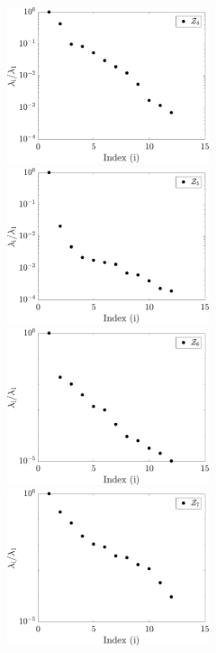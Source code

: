 \begin{figure}[htbp]
\begin{center}
\begin{subfigure}{0.35\textwidth}
\\
\includegraphics[width=0.65\textwidth]{./Figures/eig_Zf4} 
\\
\includegraphics[width=0.65\textwidth]{./Figures/eig_Zf5} 
\\
\includegraphics[width=0.65\textwidth]{./Figures/eig_Zf6} 
\\
\includegraphics[width=0.65\textwidth]{./Figures/eig_Zf7} 

\end{subfigure}
\end{center}
\end{figure}
